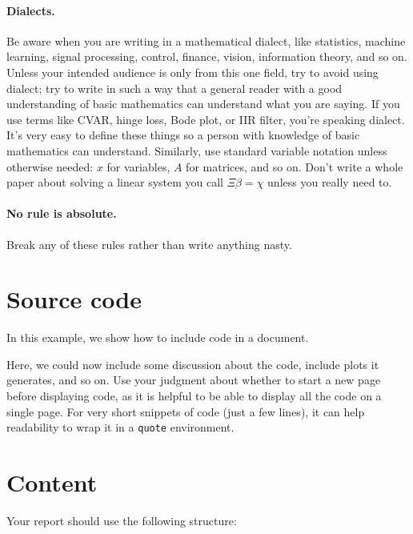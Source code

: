 \documentclass[12pt]{article}
\begin{document}
\paragraph{Dialects.}
Be aware when you are writing in a mathematical dialect, like statistics,
machine learning, signal processing, control, finance, vision, information
theory, and so on.  Unless your intended audience is only from this one field,
try to avoid using dialect; try to write in such a way that a general reader
with a good understanding of basic mathematics can understand what you are
saying.  If you use terms like CVAR, hinge loss, Bode plot, or IIR filter,
you're speaking dialect. It's very easy to define these things so a person with
knowledge of basic mathematics can understand. Similarly, use standard variable
notation unless otherwise needed: $x$ for variables, $A$ for matrices, and so
on. Don't write a whole paper about solving a linear system you call $\Xi \beta =
\chi$ unless you really need to.

\paragraph{No rule is absolute.}
Break any of these rules rather than write anything nasty.

\section{Source code}

In this example, we show how to include code in a document.

Here, we could now include some discussion about the code, include plots it
generates, and so on. Use your judgment about whether to start a new page
before displaying code, as it is helpful to be able to display all the code on
a single page. For very short snippets of code (just a few lines), it can help
readability to wrap it in a \texttt{quote} environment.

\section{Content} 
\label{s-content}

Your report should use the following structure:
\end{document}
